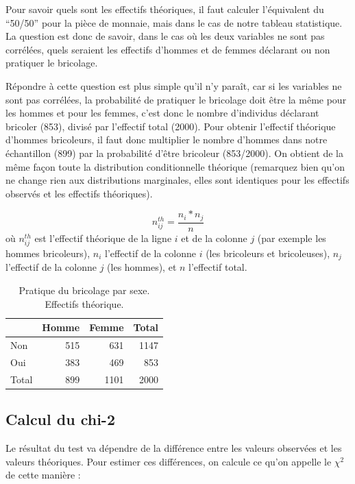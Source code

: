 \documentclass[
]{book}
\begin{document}
Pour savoir quels sont les effectifs théoriques, il faut calculer l'équivalent du ``50/50'' pour la pièce de monnaie, mais dans le cas de notre tableau statistique. La question est donc de savoir, dans le cas où les deux variables ne sont pas corrélées, quels seraient les effectifs d'hommes et de femmes déclarant ou non pratiquer le bricolage.

Répondre à cette question est plus simple qu'il n'y paraît, car si les variables ne sont pas corrélées, la probabilité de pratiquer le bricolage doit être la même pour les hommes et pour les femmes, c'est donc le nombre d'individus déclarant bricoler (853), divisé par l'effectif total (2000). Pour obtenir l'effectif théorique d'hommes bricoleurs, il faut donc multiplier le nombre d'hommes dans notre échantillon (899) par la probabilité d'être bricoleur (853/2000). On obtient de la même façon toute la distribution conditionnelle théorique (remarquez bien qu'on ne change rien aux distributions marginales, elles sont identiques pour les effectifs observés et les effectifs théoriques).

\[ n^{th}_{ij} = \frac{n_i * n_j}{n}\]
où \(n^{th}_{ij}\) est l'effectif théorique de la ligne \(i\) et de la colonne \(j\) (par exemple les hommes bricoleurs), \(n_i\) l'effectif de la colonne \(i\) (les bricoleurs et bricoleuses), \(n_j\) l'effectif de la colonne \(j\) (les hommes), et \(n\) l'effectif total.

\begin{table}

\caption{\label{tab:unnamed-chunk-24}Pratique du bricolage par sexe. Effectifs théorique.}
\centering
\begin{tabular}[t]{l|r|r|r}
\hline
  & Homme & Femme & Total\\
\hline
Non & 515 & 631 & 1147\\
\hline
Oui & 383 & 469 & 853\\
\hline
Total & 899 & 1101 & 2000\\
\hline
\end{tabular}
\end{table}

\hypertarget{calcul-du-chi-2}{%
\subsection{Calcul du chi-2}\label{calcul-du-chi-2}}

Le résultat du test va dépendre de la différence entre les valeurs observées et les valeurs théoriques. Pour estimer ces différences, on calcule ce qu'on appelle le \(\chi^2\) de cette manière :
\end{document}
